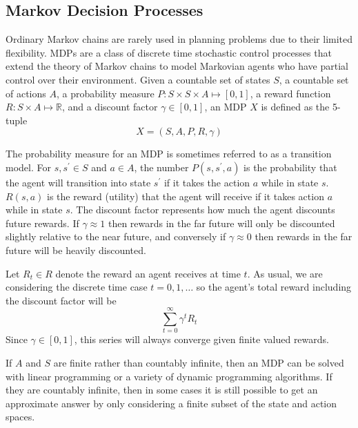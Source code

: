 \documentclass[tog]{acmsiggraph}
\newcommand{\reals}{\mathbb{R}}
\begin{document}
\subsection{Markov Decision Processes}

Ordinary Markov chains are rarely used in planning problems due to their 
limited flexibility. MDPs are a class of discrete time stochastic control 
processes that extend the theory of Markov chains to model Markovian agents 
who have partial control over their environment. Given a countable set of 
states $S$, a countable set of actions $A$, a probability measure 
$P : S \times S \times A \mapsto \left[0, 1 \right]$, a reward function 
$R : S \times A \mapsto \reals$, and a discount factor $\gamma \in \left[0, 1 \right]$,
an MDP $X$ is defined as the 5-tuple
\begin{equation*}
  X = \left(S, A, P, R, \gamma \right)
\end{equation*}

The probability measure for an MDP is sometimes referred to as a transition
 model. For $s, s^\prime \in S $ and $a \in A$, the number $P \left(s, s^\prime , a \right)$
 is the probability that the agent will transition into state $s^\prime$ 
if it takes the action $a$ while in state $s$. $R \left( s, a \right)$ is 
the reward (utility) that the agent will receive if it takes action $a$ while 
in state $s$. The discount factor represents how much the agent discounts 
future rewards. If $\gamma \approx 1$ then rewards in the far future will 
only be discounted slightly relative to the near future, and conversely if 
$\gamma \approx 0$ then rewards in the far future will be heavily discounted.

Let $R_t \in R$ denote the reward an agent receives at time $t$. As usual, 
we are considering the discrete time case $t = 0, 1, \ldots$ so the agent's 
total reward including the discount factor will be
\begin{equation*}
  \sum_{t=0}^\infty \gamma^t R_t
\end{equation*}
Since $\gamma \in \left[0, 1 \right]$, this series will always converge given 
finite valued rewards.

If $A$ and $S$ are finite rather than countably infinite, then an MDP can be solved with 
linear programming or a variety of dynamic programming algorithms. If they are countably 
infinite, then in some cases it is still possible to get an approximate answer by only 
considering a finite subset of the state and action spaces.
\end{document}
